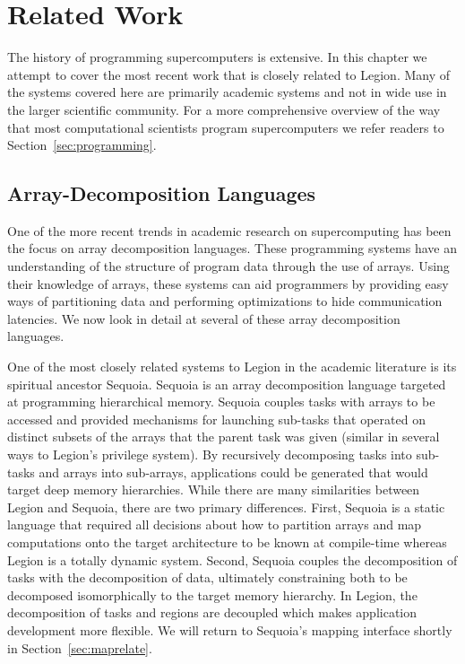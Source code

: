 
\chapter{Related Work}
\label{chapter:related}

The history of programming supercomputers 
is extensive. In this chapter we attempt
to cover the most recent work that is closely
related to Legion. Many of the systems covered
here are primarily academic systems and not
in wide use in the larger scientific community.
For a more comprehensive overview of the way
that most computational scientists program
supercomputers we refer readers to 
Section~\ref{sec:programming}.

\section{Array-Decomposition Languages}
\label{sec:decomplang}

One of the more recent trends in academic
research on supercomputing has been the focus
on array decomposition languages. These programming
systems have an understanding of the structure of
program data through the use of arrays. Using 
their knowledge of arrays, these systems can
aid programmers by providing easy ways of
partitioning data and performing optimizations
to hide communication latencies. We now
look in detail at several of these array
decomposition languages.

One of the most closely related systems to Legion in
the academic literature is its spiritual 
ancestor Sequoia\cite{Sequoia06}. Sequoia
is an array decomposition language targeted
at programming hierarchical memory. Sequoia
couples tasks with arrays to be accessed
and provided mechanisms for launching sub-tasks
that operated on distinct subsets of the
arrays that the parent task was given (similar
in several ways to Legion's privilege system). By 
recursively decomposing tasks into sub-tasks
and arrays into sub-arrays, applications could
be generated that would target deep memory
hierarchies. While there are many similarities between Legion
and Sequoia, there are two primary
differences. First, Sequoia is a static language
that required all decisions about how to 
partition arrays and map computations onto
the target architecture to be known at compile-time whereas
Legion is a totally dynamic system. Second, Sequoia
couples the decomposition of tasks with the decomposition
of data, ultimately constraining both to be 
decomposed isomorphically to the target memory 
hierarchy. In Legion, the decomposition of tasks
and regions are decoupled which makes application
development more flexible. We will return to 
Sequoia's mapping interface shortly in 
Section~\ref{sec:maprelate}.

